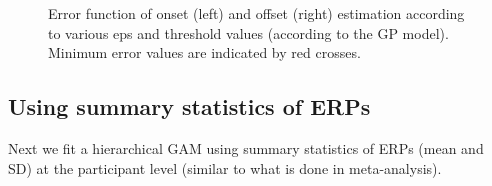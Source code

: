 \documentclass[
  doc,
  floatsintext,
  longtable,
  a4paper,
  nolmodern,
  notxfonts,
  notimes,
  colorlinks=true,linkcolor=blue,citecolor=blue,urlcolor=blue]{apa7}
\begin{document}
\begin{figure}[!htb]

\caption{\label{fig-onset-error}Error function of onset (left) and
offset (right) estimation according to various eps and threshold values
(according to the GP model). Minimum error values are indicated by red
crosses.}


\end{figure}%

\newpage

\subsection{Using summary statistics of
ERPs}\label{using-summary-statistics-of-erps}

Next we fit a hierarchical GAM using summary statistics of ERPs (mean
and SD) at the participant level (similar to what is done in
meta-analysis).
\end{document}
